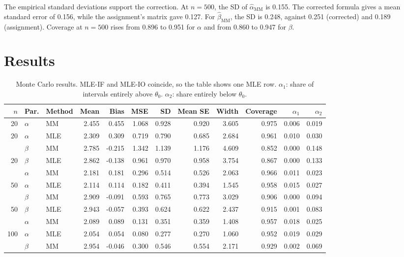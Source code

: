 \documentclass[11pt,a4paper]{article}
\begin{document}
The empirical standard deviations support the correction. At $n = 500$, the SD of $\hat\alpha_{\text{MM}}$ is 0.155. The corrected formula gives a mean standard error of 0.156, while the assignment's matrix gave 0.127. For $\hat\beta_{\text{MM}}$, the SD is 0.248, against 0.251 (corrected) and 0.189 (assignment). Coverage at $n = 500$ rises from 0.896 to 0.951 for $\alpha$ and from 0.860 to 0.947 for $\beta$.

\section{Results}
\begin{table}[H]
\centering\footnotesize
\caption{Monte Carlo results. MLE-IF and MLE-IO coincide, so the table shows one MLE row. $\alpha_1$: share of intervals entirely above $\theta_0$. $\alpha_2$: share entirely below $\theta_0$.}
\begin{tabular}{rllrrrrrrrrr}
\toprule
$n$ & Par. & Method & Mean & Bias & MSE & SD & Mean SE & Width & Coverage & $\alpha_1$ & $\alpha_2$ \\
\midrule
20 & $\alpha$ & MM & 2.455 & 0.455 & 1.068 & 0.928 & 0.920 & 3.605 & 0.975 & 0.006 & 0.019 \\
20 & $\alpha$ & MLE & 2.309 & 0.309 & 0.719 & 0.790 & 0.685 & 2.684 & 0.961 & 0.010 & 0.030 \\
\addlinespace[2pt]
20 & $\beta$ & MM & 2.785 & -0.215 & 1.342 & 1.139 & 1.176 & 4.609 & 0.852 & 0.000 & 0.148 \\
20 & $\beta$ & MLE & 2.862 & -0.138 & 0.961 & 0.970 & 0.958 & 3.754 & 0.867 & 0.000 & 0.133 \\
\addlinespace[2pt]
50 & $\alpha$ & MM & 2.181 & 0.181 & 0.296 & 0.514 & 0.526 & 2.063 & 0.966 & 0.011 & 0.023 \\
50 & $\alpha$ & MLE & 2.114 & 0.114 & 0.182 & 0.411 & 0.394 & 1.545 & 0.958 & 0.015 & 0.027 \\
\addlinespace[2pt]
50 & $\beta$ & MM & 2.909 & -0.091 & 0.593 & 0.765 & 0.773 & 3.029 & 0.906 & 0.000 & 0.094 \\
50 & $\beta$ & MLE & 2.943 & -0.057 & 0.393 & 0.624 & 0.622 & 2.437 & 0.915 & 0.001 & 0.083 \\
\addlinespace[2pt]
100 & $\alpha$ & MM & 2.089 & 0.089 & 0.131 & 0.351 & 0.359 & 1.408 & 0.957 & 0.018 & 0.025 \\
100 & $\alpha$ & MLE & 2.054 & 0.054 & 0.080 & 0.277 & 0.270 & 1.060 & 0.952 & 0.019 & 0.029 \\
\addlinespace[2pt]
100 & $\beta$ & MM & 2.954 & -0.046 & 0.300 & 0.546 & 0.554 & 2.171 & 0.929 & 0.002 & 0.069 \\

\end{tabular}
\end{table}
\end{document}
